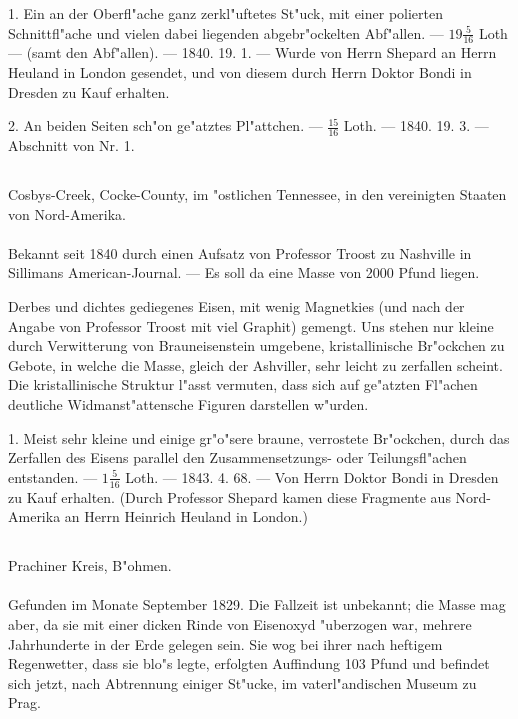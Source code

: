 \documentclass[a4paper, 11pt, oneside, polutonikogreek, german]{article}
\begin{document}
1. Ein an der Oberfl"ache ganz zerkl"uftetes St"uck, mit einer polierten Schnittfl"ache und vielen dabei liegenden abgebr"ockelten Abf"allen. --- $\mathfrak{19\frac{5}{16}}$ Loth --- (samt den Abf"allen). --- 1840. 19. 1. --- Wurde von Herrn Shepard an Herrn Heuland in London gesendet, und von diesem durch Herrn Doktor Bondi in Dresden zu Kauf erhalten.

2. An beiden Seiten sch"on ge"atztes Pl"attchen. --- $\mathfrak{\frac{15}{16}}$ Loth. --- 1840. 19. 3. --- Abschnitt von Nr. 1.
\subsection{}
\begin{center}

Cosbys-Creek, Cocke-County, im "ostlichen Tennessee, in den vereinigten Staaten von Nord-Amerika.
\end{center}
\paragraph{}
Bekannt seit 1840 durch einen Aufsatz von Professor Troost zu Nashville in Sillimans American-Journal. --- Es soll da eine Masse von 2000 Pfund liegen.

Derbes und dichtes gediegenes Eisen, mit wenig Magnetkies (und nach der Angabe von Professor Troost mit viel Graphit) gemengt. Uns stehen nur kleine durch Verwitterung von Brauneisenstein umgebene, kristallinische Br"ockchen zu Gebote, in welche die Masse, gleich der Ashviller, sehr leicht zu zerfallen scheint. Die kristallinische Struktur l"asst vermuten, dass sich auf ge"atzten Fl"achen deutliche Widmanst"attensche Figuren darstellen w"urden.

1. Meist sehr kleine und einige gr"o"sere braune, verrostete Br"ockchen, durch das Zerfallen des Eisens parallel den Zusammensetzungs- oder Teilungsfl"achen entstanden. --- $\mathfrak{1\frac{5}{16}}$ Loth. --- 1843. 4. 68. --- Von Herrn Doktor Bondi in Dresden zu Kauf erhalten. (Durch Professor Shepard kamen diese Fragmente aus Nord-Amerika an Herrn Heinrich Heuland in London.)
\subsection{}
\begin{center}

Prachiner Kreis, B"ohmen.
\end{center}
\paragraph{}
Gefunden im Monate September 1829. Die Fallzeit ist unbekannt; die Masse mag aber, da sie mit einer dicken Rinde von Eisenoxyd "uberzogen war, mehrere Jahrhunderte in der Erde gelegen sein. Sie wog bei ihrer nach heftigem Regenwetter, dass sie blo"s legte, erfolgten Auffindung 103 Pfund und befindet sich jetzt, nach Abtrennung einiger St"ucke, im vaterl"andischen Museum zu Prag.
\end{document}
